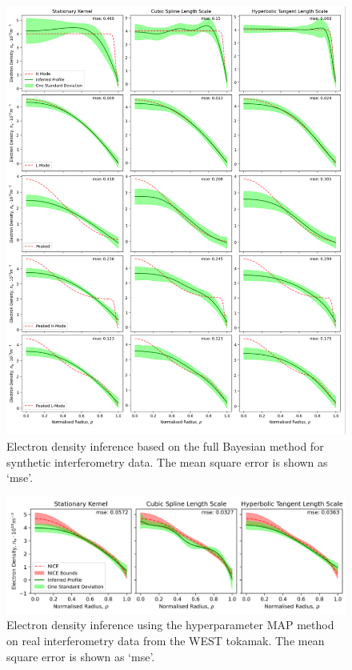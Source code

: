 \begin{figure}[H]
    \centering
    \includegraphics[width=\textwidth]{images/Final/FBsynthetic_all.png}
    \caption{Electron density inference based on the full Bayesian method for synthetic interferometry data. The mean square error is shown as `mse'.}
    \label{fig:fbreal}
\end{figure}

\restoregeometry 

\begin{figure}[H]
    \centering
    \includegraphics[width=\textwidth]{images/Final/map_real.png}
    \caption{Electron density inference using the hyperparameter MAP method on real interferometry data from the WEST tokamak. The mean square error is shown as `mse'.}
    \label{fig:map_real}
\end{figure}

